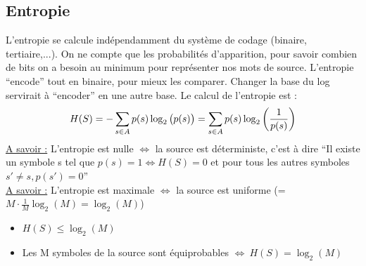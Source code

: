 \documentclass[11pt,a4paper]{article}
\renewcommand{\)}{\right)}
\renewcommand{\(}{\left(}
\begin{document}
\subsection{Entropie}
L'entropie se calcule indépendamment du système de codage (binaire, tertiaire,...). On ne compte que les probabilités d'apparition, pour savoir combien de bits on a besoin au minimum pour représenter nos mots de source.  L'entropie \enquote{encode} tout en binaire, pour mieux les comparer. Changer la base du log servirait à \enquote{encoder} en une autre base. Le calcul de l'entropie est :
\begin{equation}
	H(S) = -\sum\limits_{s\in A}^{}p(s)\log_2\big(p(s)\big) = \sum\limits_{s\in A}^{}p(s)\log_2\left(\frac{1}{p(s)}\right)
\end{equation}
\uline{A savoir :} L'entropie est nulle $\iff$ la source est déterministe, c'est à dire \enquote{Il existe un symbole s tel que $p(s) = 1 \iff H(S) = 0$ et pour tous les autres symboles $s' \neq s, p(s') = 0$}\\
\uline{A savoir :} L'entropie est maximale $\iff$ la source est uniforme (= $M\cdot \frac{1}{M}\log_2(M) = \log_2(M)$)\\
\begin{itemize}
	\item $H(S) \leq \log_2(M)$
	\item Les M symboles de la source sont équiprobables $\iff\ H(S) = \log_2(M)$
\end{itemize}
\end{document}
